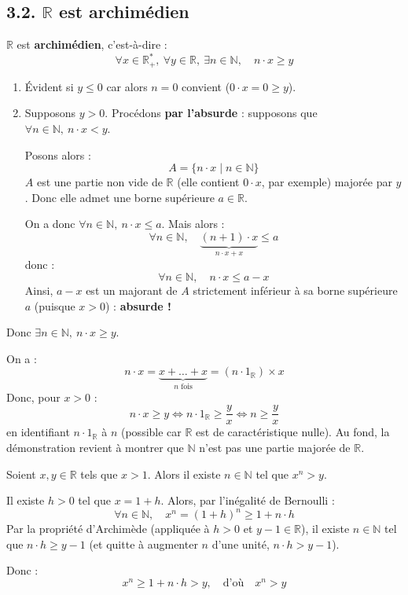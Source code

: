 \documentclass[a4paper,11pt]{article}
\newcommand{\R}{\mathbb{R}}
\newcommand{\N}{\mathbb{N}}
\newcommand{\mot}[1]{\textcolor{bordeaux}{\textbf{#1}}}
\begin{document}
\newpage
\subsection{3.2. $\R$ est archimédien}

\begin{theoreme}
$\R$ est \mot{archimédien}, c'est-à-dire :
\[
\forall x \in \R_+^*, \ \forall y \in \R, \ \exists n \in \N, \quad n \cdot x \ge y
\]
\end{theoreme}

\begin{demonstration}
\begin{enumerate}
    \item Évident si $y \le 0$ car alors $n = 0$ convient ($0 \cdot x = 0 \ge y$).
    \item Supposons $y > 0$. Procédons \textbf{par l'absurde} : supposons que $\forall n \in \N, \ n \cdot x < y$.
    
    Posons alors :
    \[
    A = \{ n \cdot x \mid n \in \N \}
    \]
    $A$ est une partie non vide de $\R$ (elle contient $0 \cdot x$, par exemple) majorée par $y$. Donc elle admet une borne supérieure $a \in \R$.
    
    On a donc $\forall n \in \N, \ n \cdot x \le a$. Mais alors :
    \[
    \forall n \in \N, \quad \underbrace{(n + 1) \cdot x}_{n \cdot x + x} \le a
    \]
    donc :
    \[
    \forall n \in \N, \quad n \cdot x \le a - x
    \]
    Ainsi, $a - x$ est un majorant de $A$ strictement inférieur à sa borne supérieure $a$ (puisque $x > 0$) : \textbf{absurde !}
\end{enumerate}
Donc $\exists n \in \N, \ n \cdot x \ge y$.
\end{demonstration}

\begin{remarque}
On a :
\[
n \cdot x = \underbrace{x + \dots + x}_{n \text{ fois}} = (n \cdot 1_\R) \times x
\]
Donc, pour $x > 0$ :
\[
n \cdot x \ge y \iff n \cdot 1_\R \ge \frac{y}{x} \iff n \ge \frac{y}{x}
\]
en identifiant $n \cdot 1_\R$ à $n$ (possible car $\R$ est de caractéristique nulle). Au fond, la démonstration revient à montrer que $\N$ n'est pas une partie majorée de $\R$.
\end{remarque}

\begin{corollaire}
Soient $x, y \in \R$ tels que $x > 1$. Alors il existe $n \in \N$ tel que $x^n > y$.
\end{corollaire}

\begin{demonstration}
Il existe $h > 0$ tel que $x = 1 + h$. Alors, par l'inégalité de Bernoulli :
\[
\forall n \in \N, \quad x^n = (1 + h)^n \ge 1 + n \cdot h
\]
Par la propriété d'Archimède (appliquée à $h > 0$ et $y - 1 \in \R$), il existe $n \in \N$ tel que $n \cdot h \ge y - 1$ (et quitte à augmenter $n$ d'une unité, $n \cdot h > y - 1$).

Donc :
\[
x^n \ge 1 + n \cdot h > y, \quad \text{d'où} \quad x^n > y
\]
\end{demonstration}
\end{document}
